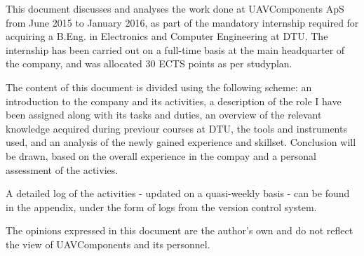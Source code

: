 This document discusses and analyses the work done at UAVComponents ApS from June 2015 to January 2016, as part of the mandatory internship required for acquiring a B.Eng. in Electronics and Computer Engineering at DTU.
The internship has been carried out on a full-time basis at the main headquarter of the company, and was allocated 30 ECTS points as per studyplan.

The content of this document is divided using the following scheme: an introduction to the company and its activities, a description of the role I have been assigned along with its tasks and duties, an overview of the relevant knowledge acquired during previour courses at DTU, the tools and instruments used, and an analysis of the newly gained experience and skillset.
Conclusion will be drawn, based on the overall experience in the compay and a personal assessment of the activies. 

A detailed log of the activities - updated on a quasi-weekly basis - can be found in the appendix, under the form of logs from the version control system.


The opinions expressed in this document are the author's own and do not reflect the view of UAVComponents and its personnel.
